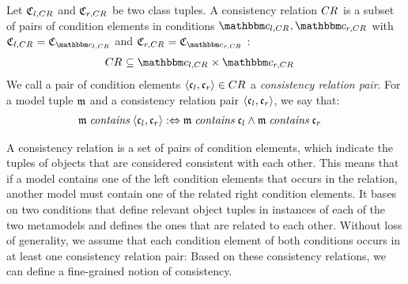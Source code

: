 \begin{definition}
\label{def:consistencyrelation}
    Let $\classtuple{C}{l,\consistencyrelation{CR}{}}$ and $\classtuple{C}{r,\consistencyrelation{CR}{}}$ be two class tuples.
    A consistency relation $\consistencyrelation{CR}{}$ is a subset of pairs of condition elements in conditions $\condition{c}{l,\consistencyrelation{CR}{}}, \condition{c}{r,\consistencyrelation{CR}{}}$ with
    $\classtuple{C}{l,\consistencyrelation{CR}{}} = \classtuple{C}{\condition{c}{l,\consistencyrelation{CR}{}}}$ and $\classtuple{C}{r,\consistencyrelation{CR}{}} = \classtuple{C}{\condition{c}{r,\consistencyrelation{CR}{}}}$ :
    \begin{align*}
        & 
        \consistencyrelation{CR}{} \subseteq \condition{c}{l,\consistencyrelation{CR}{}} \times \condition{c}{r,\consistencyrelation{CR}{}}
    \end{align*}
    We call a pair of condition elements $\tupled{\conditionelement{c}{l}, \conditionelement{c}{r}} \in \consistencyrelation{CR}{}$ a \emph{consistency relation pair}. 
    For a model tuple $\modeltuple{m}$ and a consistency relation pair $\tupled{\conditionelement{c}{l}, \conditionelement{c}{r}}$, we say that:
    \begin{align*}
        & 
        \modeltuple{m} \containsmath \tupled{\conditionelement{c}{l}, \conditionelement{c}{r}} \equivalentperdefinition \modeltuple{m} \containsmath \conditionelement{c}{l} \land \modeltuple{m} \containsmath \conditionelement{c}{r}
    \end{align*}
\end{definition}

A consistency relation is a set of pairs of condition elements, which indicate the tuples of objects that are considered consistent with each other. 
This means that if a model contains one of the left condition elements that occurs in the relation, another model must contain one of the related right condition elements.
It bases on two conditions that define relevant object tuples in instances of each of the two metamodels and defines the ones that are related to each other.
Without loss of generality, we assume that each condition element of both conditions occurs in at least one consistency relation pair:
%
Based on these consistency relations, we can define a fine-grained notion of consistency.

